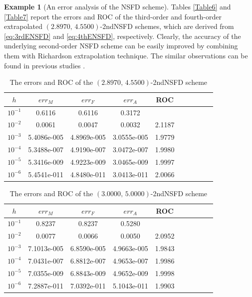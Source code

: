 \documentclass[12pt]{article}
\theoremstyle{definition}
\newtheorem{example}[theorem]{Example}
\theoremstyle{remark}
\numberwithin{equation}{section}
\begin{document}
\begin{example}[An error analysis of the NSFD scheme]
Tables \ref{Table6} and \ref{Table7} report the errors and ROC of the third-order and fourth-order extrapolated $(2.8970,\,4.5500)$-2ndNSFD schemes, which are derived from \eqref{eq:3rdENSFD} and \eqref{eq:4thENSFD}, respectively. Clearly, the accuracy of the underlying second-order NSFD scheme can be easily improved by combining them with Richardson extrapolation technique. The similar observations can be found in previous studies \cite{GParra, Martin-Vaquero1, Martin-Vaquero2}.
%
%
\begin{table}[H]
\begin{center}
\caption{The errors and ROC of the $(2.8970,\,4.5500)$-2ndNSFD scheme}\label{Table1}
\begin{tabular}{cccccccccc}
\hline
$h$&$err_M$&$err_F$&$err_A$&ROC\\
\hline
$10^{-1}$&0.6116&0.6116&0.3172&\\
$10^{-2}$&0.0061&0.0047& 0.0032&2.1187\\
$10^{-3}$&5.4086e-005&4.8969e-005&3.0555e-005&1.9779\\
$10^{-4}$&5.3488e-007& 4.9190e-007&3.0472e-007&1.9980\\
$10^{-5}$&5.3416e-009&4.9223e-009&3.0465e-009&1.9997\\
$10^{-6}$&5.4541e-011&4.8480e-011&3.0413e-011&2.0066\\
\hline
\end{tabular}
\end{center}
\end{table}
%
%
%
%
%
%
%
%
\begin{table}[H]
\begin{center}
\caption{The errors and ROC of the $(3.0000,\,5.0000)$-2ndNSFD scheme}\label{Table2}
\begin{tabular}{cccccccccc}
\hline
$h$&$err_M$&$err_F$&$err_A$&ROC\\
\hline
$10^{-1}$&0.8237&0.8237&0.5280&\\
$10^{-2}$&0.0077&0.0066&0.0050&2.0952\\
$10^{-3}$&7.1013e-005&6.8590e-005&4.9663e-005&1.9843\\
$10^{-4}$&7.0431e-007&6.8812e-007&4.9653e-007& 1.9986\\
$10^{-5}$&7.0355e-009&6.8843e-009&4.9652e-009&1.9998\\
$10^{-6}$& 7.2887e-011&7.0392e-011& 5.1043e-011&1.9903\\
\hline
\end{tabular}

\end{center}
\end{table}
\end{example}
\end{document}

